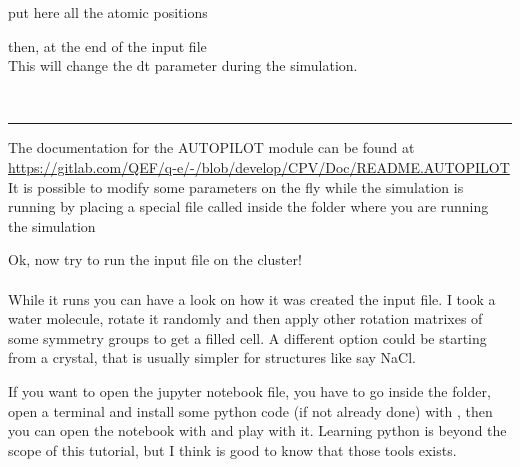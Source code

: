 \documentclass[landscape]{foils}
\begin{document}
\begin{minipage}{0.5\textwidth}
put here all the atomic positions\\
\end{minipage}
\begin{minipage}{0.5\textwidth}
then, at the end of the input file\\
This will change the dt parameter during the simulation.
\end{minipage}\\

\hrule The documentation for the AUTOPILOT module can be found at
\url{https://gitlab.com/QEF/q-e/-/blob/develop/CPV/Doc/README.AUTOPILOT}
It is possible to modify some parameters on the fly while the simulation is running by placing a special file called  inside the folder where you are running the simulation

Ok, now try to run the input file on the cluster!\\
\\
While it runs you can have a look on how it was created the input file. I took a water molecule, rotate it randomly and then apply other rotation matrixes of some symmetry groups to get a filled cell. A different option could be starting from a crystal, that is usually simpler for structures like say NaCl.

If you want to open the jupyter notebook file, you have to go inside the  folder, open a terminal and install some python code (if not already done) with , then you can open the notebook with  and play with it. Learning python is beyond the scope of this tutorial, but I think is good to know that those tools exists.
\end{document}
